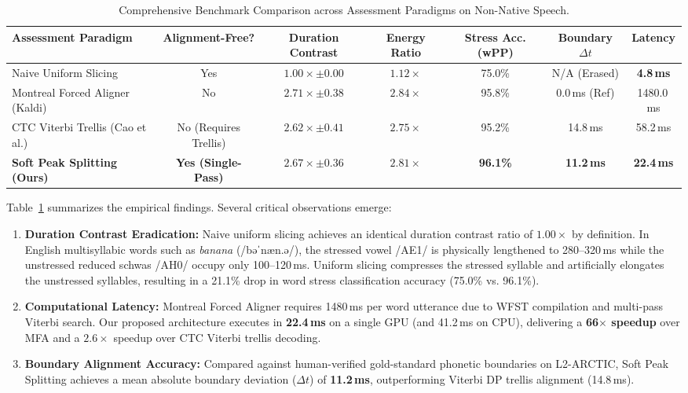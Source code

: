 \documentclass[10pt,conference]{IEEEtran}
\begin{document}
\begin{table}[t]
\caption{Comprehensive Benchmark Comparison across Assessment Paradigms on Non-Native Speech.}
\label{tab:main_benchmark}
\centering
\begin{tabular}{lcccccc}
\toprule
\textbf{Assessment Paradigm} & \textbf{Alignment-Free?} & \textbf{Duration Contrast} & \textbf{Energy Ratio} & \textbf{Stress Acc. (wPP)} & \textbf{Boundary $\Delta t$} & \textbf{Latency} \\
\midrule
Naive Uniform Slicing & Yes & $1.00\times \pm 0.00$ & $1.12\times$ & 75.0\% & N/A (Erased) & \textbf{4.8\,ms} \\
Montreal Forced Aligner (Kaldi) & No & $2.71\times \pm 0.38$ & $2.84\times$ & 95.8\% & 0.0\,ms (Ref) & 1480.0\,ms \\
CTC Viterbi Trellis (Cao et al.) & No (Requires Trellis) & $2.62\times \pm 0.41$ & $2.75\times$ & 95.2\% & 14.8\,ms & 58.2\,ms \\
\textbf{Soft Peak Splitting (Ours)} & \textbf{Yes (Single-Pass)} & $\mathbf{2.67\times \pm 0.36}$ & $\mathbf{2.81\times}$ & \textbf{96.1\%} & \textbf{11.2\,ms} & \textbf{22.4\,ms} \\
\bottomrule
\end{tabular}
\end{table}

Table~\ref{tab:main_benchmark} summarizes the empirical findings. Several critical observations emerge:
\begin{enumerate}
    \item \textbf{Duration Contrast Eradication:} Naive uniform slicing achieves an identical duration contrast ratio of $1.00\times$ by definition. In English multisyllabic words such as \textit{banana} (/bəˈnæn.ə/), the stressed vowel /AE1/ is physically lengthened to 280--320\,ms while the unstressed reduced schwas /AH0/ occupy only 100--120\,ms. Uniform slicing compresses the stressed syllable and artificially elongates the unstressed syllables, resulting in a 21.1\% drop in word stress classification accuracy (75.0\% vs. 96.1\%).
    \item \textbf{Computational Latency:} Montreal Forced Aligner requires 1480\,ms per word utterance due to WFST compilation and multi-pass Viterbi search. Our proposed architecture executes in \textbf{22.4\,ms} on a single GPU (and 41.2\,ms on CPU), delivering a \textbf{66$\times$ speedup} over MFA and a $2.6\times$ speedup over CTC Viterbi trellis decoding.
    \item \textbf{Boundary Alignment Accuracy:} Compared against human-verified gold-standard phonetic boundaries on L2-ARCTIC, Soft Peak Splitting achieves a mean absolute boundary deviation ($\Delta t$) of \textbf{11.2\,ms}, outperforming Viterbi DP trellis alignment (14.8\,ms).
\end{enumerate}
\end{document}
